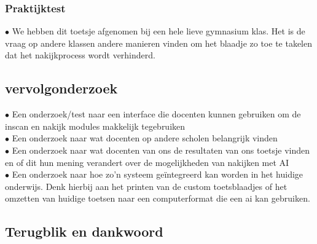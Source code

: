 \documentclass[12pt]{article}
\begin{document}
\begin{multicols}{2}
\begin{minipage}{\linewidth}
\subsubsection{Praktijktest}
$\bullet$ We hebben dit toetsje afgenomen bij een hele lieve gymnasium klas. Het is de vraag op andere klassen andere manieren vinden om het blaadje zo toe te takelen dat het nakijkprocess wordt verhinderd.\\
\end{minipage}
\pagebreak
\subsection{vervolgonderzoek}
$\bullet$ Een onderzoek/test naar een interface die docenten kunnen gebruiken om de inscan en nakijk modules makkelijk tegebruiken\\
$\bullet$ Een onderzoek naar wat docenten op andere scholen belangrijk vinden\\
$\bullet$ Een onderzoek naar wat docenten van ons de resultaten van ons toetsje vinden en of dit hun mening verandert over de mogelijkheden van nakijken met AI\\
$\bullet$ Een onderzoek naar hoe zo'n systeem geïntegreerd kan worden in het huidige onderwijs. Denk hierbij aan het printen van de custom toetsblaadjes of het omzetten van huidige toetsen naar een computerformat  die een ai kan gebruiken.\\


\subsection{Terugblik en dankwoord}


\end{multicols}
\end{document}
